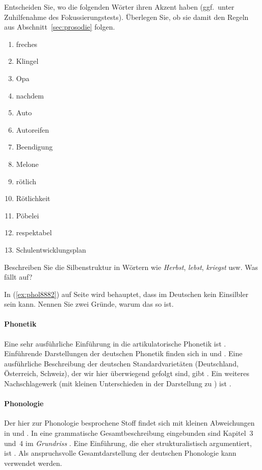 \Uebung \label{u45} Entscheiden Sie, wo die folgenden Wörter ihren Akzent haben (ggf.\ unter Zuhilfenahme des Fokussierungstests).
Überlegen Sie, ob sie damit den Regeln aus Abschnitt~\ref{sec:prosodie} folgen.

\begin{enumerate}\Lf
  \item freches
  \item Klingel
  \item Opa
  \item nachdem
  \item Auto
  \item Autoreifen
  \item Beendigung
  \item Melone
  \item rötlich
  \item Rötlichkeit
  \item Pöbelei
  \item respektabel
  \item Schulentwicklungsplan
\end{enumerate}

\Uebung[\tristar] \label{u46} Beschreiben Sie die Silbenstruktur in Wörtern wie \textit{Herbst}, \textit{lebst}, \textit{kriegst} usw.
Was fällt auf?

\Uebung[\tristar] \label{u47} In (\ref{ex:phol8882}) auf Seite \pageref{ex:phol8882} wird behauptet, dass \textipa{[s5]} im Deutschen kein Einsilbler sein kann.
Nennen Sie zwei Gründe, warum das so ist.

\WeitereLiteratur

\paragraph*{Phonetik}

Eine sehr ausführliche Einführung in die artikulatorische Phonetik ist \citet{Laver94}.
Einführende Darstellungen der deutschen Phonetik finden sich \zB in \citet{RRKWS09} und \citet{Wiese10}.
Eine ausführliche Beschreibung der deutschen Standardvarietäten (Deutschland, Österreich, Schweiz), der wir hier überwiegend gefolgt sind, gibt \citet{Krech-ea2009}.
Ein weiteres Nachschlagewerk (mit kleinen Unterschieden in der Darstellung zu \citealp{Krech-ea2009}) ist \citet{Mangold06}.

\paragraph*{Phonologie}

Der hier zur Phonologie besprochene Stoff findet sich mit kleinen Abweichungen \zB in \citet{Hall00} und \citet{Wiese10}.
In eine grammatische Gesamtbeschreibung eingebunden sind Kapitel~3 und~4 im \textit{Grundriss} \citep{Eisenberg1}.
Eine Einführung, die eher strukturalistisch argumentiert, ist \citet{Ternes2012}.
Als anspruchsvolle Gesamtdarstellung der deutschen Phonologie kann \citet{Wiese00} verwendet werden.
